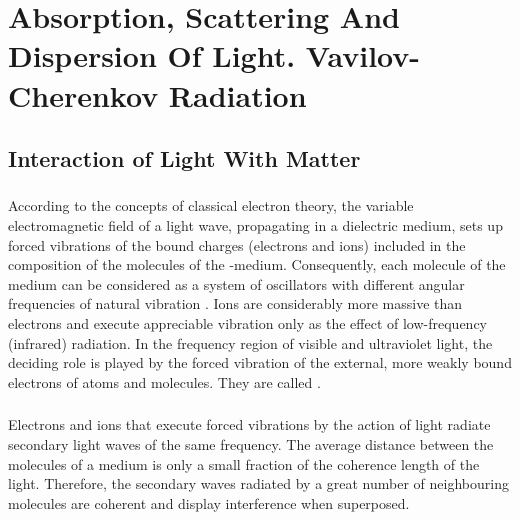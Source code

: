 





\chapter[Absorption, Scattering And Dispersion Of Light]{Absorption, Scattering And Dispersion Of Light. Vavilov-Cherenkov Radiation}
\label{ch-34}

\section{Interaction of Light With Matter}
\label{sec-34.1} 


\subsection{}\label{34.1.1} According to the concepts of classical electron theory, the variable electromagnetic field of a light wave, propagating in a dielectric medium, sets up forced vibrations of the bound charges (electrons and ions) included in the composition of the molecules of the -medium. Consequently, each molecule of the medium can be considered as a system of oscillators with different angular frequencies of natural vibration . Ions are considerably more massive than electrons and execute appreciable vibration only as the effect of low-frequency (infrared) radiation. In the frequency region of visible and ultraviolet light, the deciding role is played by the forced vibration of the external, more weakly bound electrons of atoms and molecules.
They are called .

\subsection{}\label{34.1.2} Electrons and ions that execute forced vibrations by the action of light radiate secondary light waves of the same frequency. The average distance between the molecules of a medium is only a small fraction of the coherence length  of the light. Therefore, the secondary waves radiated by a great number of neighbouring molecules are coherent and display interference when superposed.

